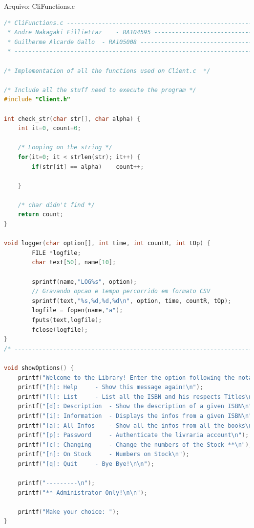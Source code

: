 \documentclass[10pt,a4paper]{report}
\begin{document}
\begin{center}
Arquivo: CliFunctions.c
\end{center}
\begin{lstlisting}[language=C]
/* CliFunctions.c -------------------------------------------------------------------- 
 * Andre Nakagaki Filliettaz 	- RA104595 ------------------------------------- 
 * Guilherme Alcarde Gallo 	- RA105008 ------------------------------------- 
 * -------------------------------------------------------------------------- */ 

/* Implementation of all the functions used on Client.c  */ 
 
/* Include all the stuff need to execute the program */ 
#include "Client.h" 

int check_str(char str[], char alpha) { 
	int it=0, count=0; 

	/* Looping on the string */ 
	for(it=0; it < strlen(str); it++) { 
		if(str[it] == alpha)	count++; 

	} 

	/* char didn't find */ 
	return count; 
} 

void logger(char option[], int time, int countR, int tOp) {
        FILE *logfile;
        char text[50], name[10];
     
        sprintf(name,"LOG%s", option);
        // Gravando opcao e tempo percorrido em formato CSV
        sprintf(text,"%s,%d,%d,%d\n", option, time, countR, tOp);
        logfile = fopen(name,"a");
        fputs(text,logfile);
        fclose(logfile);
}
/* -------------------------------------------------------------------------- */ 

void showOptions() { 
	printf("Welcome to the Library! Enter the option following the notation:\n"); 
	printf("[h]: Help 	  - Show this message again!\n"); 
	printf("[l]: List  	  - List all the ISBN and his respects Titles\n"); 
	printf("[d]: Description  - Show the description of a given ISBN\n"); 
	printf("[i]: Information  - Displays the infos from a given ISBN\n"); 
	printf("[a]: All Infos	  - Show all the infos from all the books\n"); 
	printf("[p]: Password	  - Authenticate the livraria account\n"); 
	printf("[c]: Changing	  - Change the numbers of the Stock **\n"); 
	printf("[n]: On Stock	  - Numbers on Stock\n"); 
	printf("[q]: Quit	  - Bye Bye!\n\n"); 

	printf("---------\n"); 
	printf("** Administrator Only!\n\n"); 

	printf("Make your choice: "); 
} 


\end{lstlisting}
\end{document}
